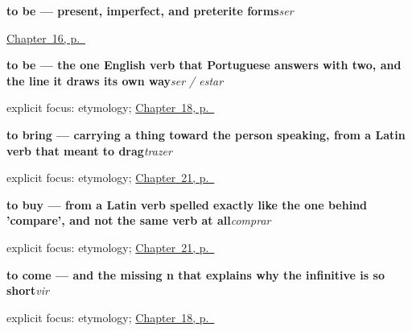 \noindent\begin{minipage}[t]{\linewidth}
\raggedright
\textbf{to be — present, imperfect, and preterite forms}\enspace\emph{ser}\par
\footnotesize \hyperref[ch:pt-ser-and-estar]{Chapter~16, p.~\pageref*{ch:pt-ser-and-estar}}
\end{minipage}\par\smallskip

\noindent\begin{minipage}[t]{\linewidth}
\raggedright
\textbf{to be — the one English verb that Portuguese answers with two, and the line it draws its own way}\enspace\emph{ser / estar}\par
\footnotesize explicit focus: etymology; \hyperref[ch:pt-core-verbs]{Chapter~18, p.~\pageref*{ch:pt-core-verbs}}
\end{minipage}\par\smallskip

\noindent\begin{minipage}[t]{\linewidth}
\raggedright
\textbf{to bring — carrying a thing toward the person speaking, from a Latin verb that meant to drag}\enspace\emph{trazer}\par
\footnotesize explicit focus: etymology; \hyperref[ch:pt-bringing-getting-waiting-buying]{Chapter~21, p.~\pageref*{ch:pt-bringing-getting-waiting-buying}}
\end{minipage}\par\smallskip

\noindent\begin{minipage}[t]{\linewidth}
\raggedright
\textbf{to buy — from a Latin verb spelled exactly like the one behind 'compare', and not the same verb at all}\enspace\emph{comprar}\par
\footnotesize explicit focus: etymology; \hyperref[ch:pt-bringing-getting-waiting-buying]{Chapter~21, p.~\pageref*{ch:pt-bringing-getting-waiting-buying}}
\end{minipage}\par\smallskip

\noindent\begin{minipage}[t]{\linewidth}
\raggedright
\textbf{to come — and the missing n that explains why the infinitive is so short}\enspace\emph{vir}\par
\footnotesize explicit focus: etymology; \hyperref[ch:pt-core-verbs]{Chapter~18, p.~\pageref*{ch:pt-core-verbs}}
\end{minipage}\par\smallskip

